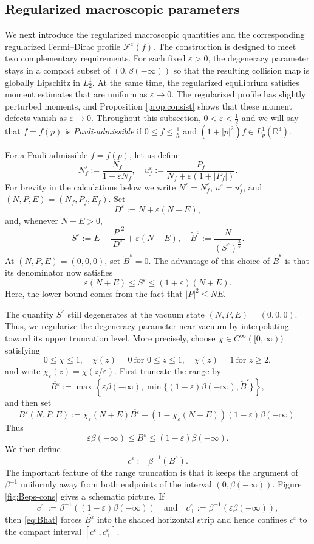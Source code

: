 \documentclass[10pt,reqno]{amsart}
\numberwithin{equation}{section}
\theoremstyle{definition}
\newcommand{\R}{\mathbb R}
\newcommand{\be}{B^{\varepsilon}}
\newcommand{\e}{\varepsilon}
\newcommand{\calF}{\mathcal F}
\newcommand{\bq}{\begin{equation}}
\newcommand{\eq}{\end{equation}}
\newcommand{\lt}{\left}
\newcommand{\rt}{\right}
\begin{document}
%
%
%
%
%
%

\subsection{Regularized macroscopic parameters}

We next introduce the regularized macroscopic quantities and the corresponding regularized Fermi--Dirac profile $\calF^\e(f)$.  The construction is designed  to meet two complementary requirements. For each fixed $\e>0$, the degeneracy parameter stays in a compact subset of $(0,\beta(-\infty))$ so that the resulting collision map is globally Lipschitz in $L^1_2$.  At the same time, the regularized equilibrium satisfies moment estimates that are uniform as $\e\to0$.  The regularized profile has slightly perturbed moments, and Proposition \ref{prop:consist} shows that these moment defects vanish as $\e\to0$. Throughout this subsection, $0<\e<\frac12$ and we will say that $f=f(p)$ is \emph{Pauli-admissible} if $0\le f \le \frac1\hbar$ and $(1+|p|^2)f\in L^1_p(\R^3)$. 

For a Pauli-admissible $f=f(p)$, let us define
\bq \label{eq:reg-N-u}
 N_f^\e:=\frac{N_f}{1+\e N_f},  \quad  u_f^\e:=\frac{P_f}{N_f+\e(1+|P_f|)}.
\eq
For brevity in the calculations below we write $N^\e=N_f^\e$, $u^\e=u_f^\e$, and $(N,P,E)=(N_f,P_f,E_f)$. Set
\[
 D^\e:=N+\e(N+E),
\]
and, whenever $N+E>0$,
\[
 S^\e:=E-\frac{|P|^2}{D^\e}+\e(N+E),  \quad  \widetilde B^\e:=\frac{N}{(S^\e)^{\frac35}}.
\]
At $(N,P,E)=(0,0,0)$, set $\widetilde B^\e=0$.  The advantage of this choice of $\widetilde B^\e$ is that its denominator now satisfies 
\bq \label{eq:S-bds}
 \e(N+E)\leq S^\e\leq(1+\e)(N+E).
\eq
Here, the lower bound comes from the fact that $|P|^2\leq NE$. 

The quantity $S^\e$ still degenerates at the vacuum state $(N,P,E)=(0,0,0)$. Thus, we regularize the degeneracy parameter near vacuum by interpolating toward its upper truncation level. More precisely, choose
$\chi\in C^\infty([0,\infty))$ satisfying
\[
 0\leq\chi\leq1,  \quad  \chi(z)=0\ \text{for }0\leq z\leq1,  \quad  \chi(z)=1\ \text{for }z\geq2,
\]
and write $\chi_\e(z)=\chi(z/\e)$. First truncate the range by
\bq \label{eq:Bhat}
 \overline{B^\e}  :=\max\lt\{  \e\beta(-\infty),  \min\{(1-\e)\beta(-\infty),\widetilde B^\e\}  \rt\},
\eq
and then set
\[
 \be(N,P,E)  :=\chi_\e(N+E)\overline{B^\e}  +(1-\chi_\e(N+E))(1-\e)\beta(-\infty).
\]
Thus
\bq \label{eq:Beps-range}
 \e\beta(-\infty)\leq\be\leq(1-\e)\beta(-\infty).
\eq
We then define
\begin{equation*}
 c^\e:=\beta^{-1}(\be).
\end{equation*}
The important feature of the range truncation is that it keeps the argument of $\beta^{-1}$ uniformly away from both endpoints of the interval $(0,\beta(-\infty))$.  Figure \ref{fig:Beps-cons} gives a schematic picture.  If
\[
 c_-^\e:=\beta^{-1}((1-\e)\beta(-\infty))  \quad \text{and} \quad   c_+^\e:=\beta^{-1}(\e\beta(-\infty)),
\]
then \eqref{eq:Bhat} forces $\overline{B^\e}$ into the shaded horizontal strip and hence confines $c^\e$ to the compact interval $[c_-^\e,c_+^\e]$.   
\end{document}
